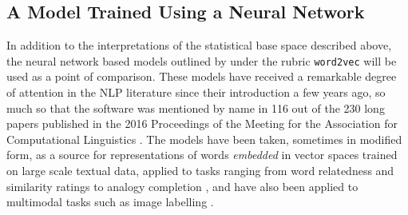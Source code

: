 


\subsection{A Model Trained Using a Neural Network} \label{sec:w2v}
In addition to the interpretations of the statistical base space described above, the neural network based models outlined by \cite{MikolovEA2013b} under the rubric \texttt{word2vec} will be used as a point of comparison.  These models have received a remarkable degree of attention in the NLP literature since their introduction a few years ago, so much so that the software was mentioned by name in 116 out of the 230 long papers published in the 2016 Proceedings of the Meeting for the Association for Computational Linguistics \citep{ErkEA2016}.  The models have been taken, sometimes in modified form, as a source for representations of words \emph{embedded} in vector spaces trained on large scale textual data, applied to tasks ranging from word relatedness and similarity ratings \citep{KielaEA2015} to analogy completion \citep{MikolovEA2013}, and have also been applied to multimodal tasks such as image labelling \citep{KotturEA2016}.

